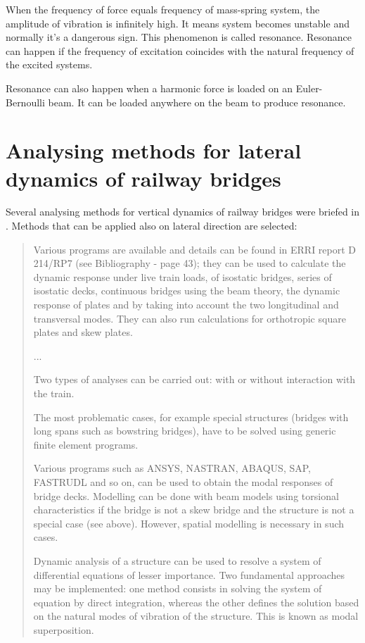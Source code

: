 When the frequency of force equals frequency of mass-spring system, the amplitude of vibration is infinitely high. It means system becomes unstable and normally it's a dangerous sign. This phenomenon is called resonance. Resonance can happen if the frequency of excitation coincides with the natural frequency of the excited systems.

Resonance can also happen when a harmonic force is loaded on an Euler-Bernoulli beam. It can be loaded anywhere on the beam to produce resonance. 


\section{Analysing methods for lateral dynamics of railway bridges }

Several analysing methods for vertical dynamics of railway bridges were briefed in \cite[A6.2]{UIC776-2}. Methods that can be applied also on lateral direction are selected:

\begin{quote}

Various programs are available and details can be found in ERRI report D 214/RP7 (see Bibliography - page 43); they can be used to calculate the dynamic response under live train loads, of isostatic bridges, series of isostatic decks, continuous bridges using the beam theory, the dynamic response of plates and by taking into account the two longitudinal and transversal modes. They can also run calculations for orthotropic square plates and skew plates.

...

Two types of analyses can be carried out: with or without interaction with the train.

The most problematic cases, for example special structures (bridges with long spans such as bowstring bridges), have to be solved using generic finite element programs.

Various programs such as ANSYS, NASTRAN, ABAQUS, SAP, FASTRUDL and so on, can be used to obtain the modal responses of bridge decks. Modelling can be done with beam models using torsional characteristics if the bridge is not a skew bridge and the structure is not a special case (see above). However, spatial modelling is necessary in such cases.

Dynamic analysis of a structure can be used to resolve a system of differential equations of lesser importance. Two fundamental approaches may be implemented: one method consists in solving the system of equation by direct integration, whereas the other defines the solution based on the natural modes of vibration of the structure. This is known as modal superposition. 
\end{quote}

